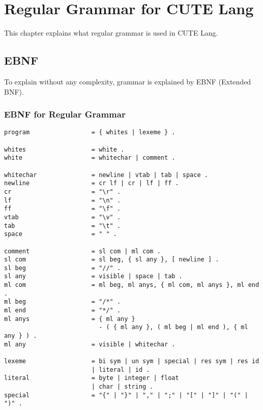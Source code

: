 \documentclass[a4paper, article, oneside, 10pt]{memoir}
\begin{document}
\pagestyle{ruled}
\chapter{Regular Grammar for CUTE Lang}
This chapter explains what regular grammar is used in CUTE Lang.

\section{EBNF}
To explain without any complexity, grammar is explained by EBNF (Extended BNF).

\subsection{EBNF for Regular Grammar}

\begin{verbatim}
program                 = { whites | lexeme } .

whites                  = white .
white                   = whitechar | comment .

whitechar               = newline | vtab | tab | space .
newline                 = cr lf | cr | lf | ff .
cr                      = "\r" .
lf                      = "\n" .
ff                      = "\f" .
vtab                    = "\v" .
tab                     = "\t" .
space                   = " " .

comment                 = sl com | ml com .
sl com                  = sl beg, { sl any }, [ newline ] .
sl beg                  = "//" .
sl any                  = visible | space | tab .
ml com                  = ml beg, ml anys, { ml com, ml anys }, ml end .
ml beg                  = "/*" .
ml end                  = "*/" .
ml anys                 = { ml any }
                          - ( { ml any }, ( ml beg | ml end ), { ml any } ) .
ml any                  = visible | whitechar .

lexeme                  = bi sym | un sym | special | res sym | res id
                        | literal | id .
literal                 = byte | integer | float
                        | char | string .
special                 = "{" | "}" | "," | ";" | "[" | "]" | "(" | ")" .
\end{verbatim}
\end{document}
